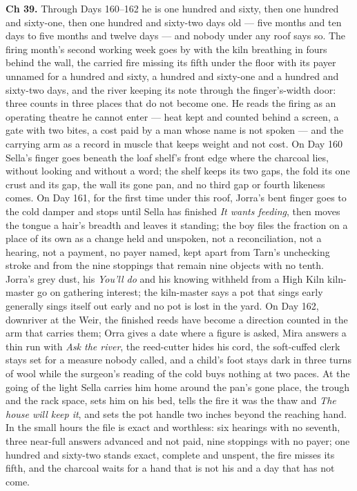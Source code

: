 \documentclass{design/chronicle}
\begin{document}
{\textbf{Ch 39.} Through Days 160–162 he is one hundred and sixty, then one hundred and sixty-one, then one hundred and sixty-two days old — five months and ten days to five months and twelve days — and nobody under any roof says so. The firing month’s second working week goes by with the kiln breathing in fours behind the wall, the carried fire missing its fifth under the floor with its payer unnamed for a hundred and sixty, a hundred and sixty-one and a hundred and sixty-two days, and the river keeping its note through the finger’s-width door: three counts in three places that do not become one. He reads the firing as an operating theatre he cannot enter — heat kept and counted behind a screen, a gate with two bites, a cost paid by a man whose name is not spoken — and the carrying arm as a record in muscle that keeps weight and not cost. On Day 160 Sella’s finger goes beneath the loaf shelf’s front edge where the charcoal lies, without looking and without a word; the shelf keeps its two gaps, the fold its one crust and its gap, the wall its gone pan, and no third gap or fourth likeness comes. On Day 161, for the first time under this roof, Jorra’s bent finger goes to the cold damper and stops until Sella has finished \emph{It wants feeding}, then moves the tongue a hair’s breadth and leaves it standing; the boy files the fraction on a place of its own as a change held and unspoken, not a reconciliation, not a hearing, not a payment, no payer named, kept apart from Tarn’s unchecking stroke and from the nine stoppings that remain nine objects with no tenth. Jorra’s grey dust, his \emph{You’ll do} and his knowing withheld from a High Kiln kiln-master go on gathering interest; the kiln-master says a pot that sings early generally sings itself out early and no pot is lost in the yard. On Day 162, downriver at the Weir, the finished reeds have become a direction counted in the arm that carries them; Orra gives a date where a figure is asked, Mira answers a thin run with \emph{Ask the river}, the reed-cutter hides his cord, the soft-cuffed clerk stays set for a measure nobody called, and a child’s foot stays dark in three turns of wool while the surgeon’s reading of the cold buys nothing at two paces. At the going of the light Sella carries him home around the pan’s gone place, the trough and the rack space, sets him on his bed, tells the fire it was the thaw and \emph{The house will keep it}, and sets the pot handle two inches beyond the reaching hand. In the small hours the file is exact and worthless: six hearings with no seventh, three near-full answers advanced and not paid, nine stoppings with no payer; one hundred and sixty-two stands exact, complete and unspent, the fire misses its fifth, and the charcoal waits for a hand that is not his and a day that has not come.

}
\end{document}
